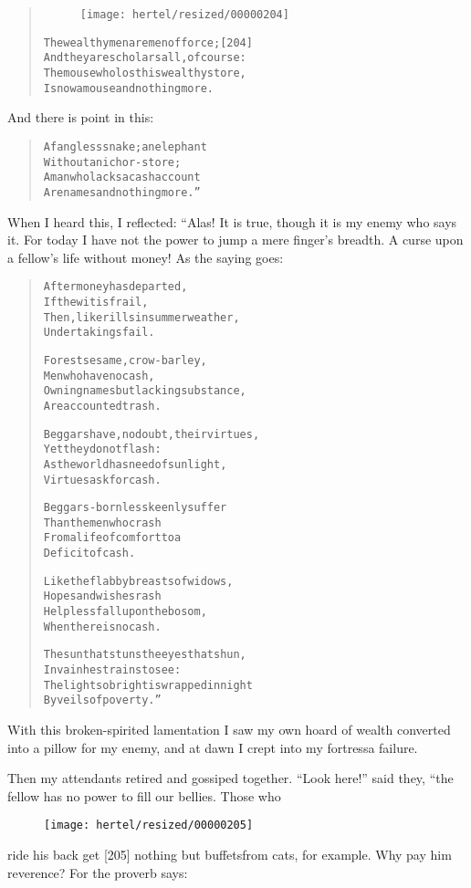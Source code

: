\documentclass[article, twoside, 10pt]{memoir}
\renewenvironment{verbatim}{%
\begin{quote}%
\vskip -10pt%
\begin{alltt}\normalfont\small}{\end{alltt}%
\end{quote}%
\vskip -10pt
} %
\begin{document}
\begin{verbatim}
\begin{figure}[p]\texttt{[image: hertel/resized/00000204]}\end{figure}The wealthy men are men of force;                       [204]
And they are scholars all, of course:
The mouse who lost his wealthy store,
Is now a mouse and nothing more.
\end{verbatim}
And there is point in this:

\begin{verbatim}
A fangless snake; an elephant
Without an ichor-store;
A man who lacks a cash account{\textemdash}
Are names and nothing more.”
\end{verbatim}
When I heard this, I reflected: “Alas! It is true, though it is my
enemy who says it. For today I have not the power to jump a mere
finger's breadth. A curse upon a fellow's life without money! As
the saying goes:

\begin{verbatim}
After money has departed,
    If the wit is frail,
Then, like rills in summer weather,
    Undertakings fail.

Forest sesame, crow-barley,
    Men who have no cash,
Owning names but lacking substance,
    Are accounted trash.

Beggars have, no doubt, their virtues,
    Yet they do not flash:
As the world has need of sunlight,
    Virtues ask for cash.

Beggars-born less keenly suffer
    Than the men who crash
From a life of comfort to a
    Deficit of cash.

Like the flabby breasts of widows,
    Hopes and wishes rash
Helpless fall upon the bosom,
    When there is no cash.

The sun that stuns the eyes that shun,
    In vain he strains to see:
The light so bright is wrapped in night
    By veils of poverty.”
\end{verbatim}
With this broken-spirited lamentation I saw my own hoard of wealth
converted into a pillow for my enemy, and at dawn I crept into my
fortress{\textemdash}a failure.

Then my attendants retired and gossiped together. ``Look here!''
said they, “the fellow has no power to fill our bellies. Those who
\begin{figure}[p]\texttt{[image: hertel/resized/00000205]}\end{figure}ride his back get [205] nothing but buffets{\textemdash}from cats, for
example. Why pay him reverence? For the proverb says:
\end{document}
